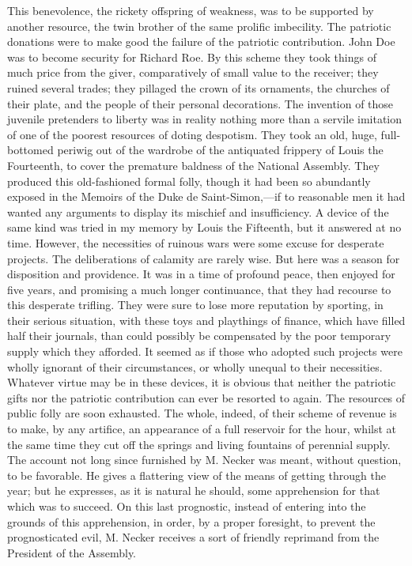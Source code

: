 This benevolence, the rickety offspring of weakness, was to be supported by another resource, the twin brother of the same prolific imbecility. The patriotic donations were to make good the failure of the patriotic contribution. John Doe was to become security for Richard Roe. By this scheme they took things of much price from the giver, comparatively of small value to the receiver; they ruined several trades; they pillaged the crown of its ornaments, the churches of their plate, and the people of their personal decorations. The invention of those juvenile pretenders to liberty was in reality nothing more than a servile imitation of one of the poorest resources of doting despotism. They took an old, huge, full-bottomed periwig out of the wardrobe of the antiquated frippery of Louis the Fourteenth, to cover the premature baldness of the National Assembly. They produced this old-fashioned formal folly, though it had been so abundantly exposed in the Memoirs of the Duke de Saint-Simon,—if to reasonable men it had wanted any arguments to display its mischief and insufficiency. A device of the same kind was tried in my memory by Louis the Fifteenth, but it answered at no time. However, the necessities of ruinous wars were some excuse for desperate projects. The deliberations of calamity are rarely wise. But here was a season for disposition and providence. It was in a time of profound peace, then enjoyed for five years, and promising a much longer continuance, that they had recourse to this desperate trifling. They were sure to lose more reputation by sporting, in their serious situation, with these toys and playthings of finance, which have filled half their journals, than could possibly be compensated by the poor temporary supply which they afforded. It seemed as if those who adopted such projects were wholly ignorant of their circumstances, or wholly unequal to their necessities. Whatever virtue may be in these devices, it is obvious that neither the patriotic gifts nor the patriotic contribution can ever be resorted to again. The resources of public folly are soon exhausted. The whole, indeed, of their scheme of revenue is to make, by any artifice, an appearance of a full reservoir for the hour, whilst at the same time they cut off the springs and living fountains of perennial supply. The account not long since furnished by M. Necker was meant, without question, to be favorable. He gives a flattering view of the means of getting through the year; but he expresses, as it is natural he should, some apprehension for that which was to succeed. On this last prognostic, instead of entering into the grounds of this apprehension, in order, by a proper foresight, to prevent the prognosticated evil, M. Necker receives a sort of friendly reprimand from the President of the Assembly.

